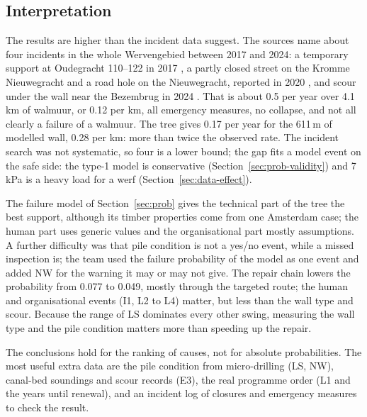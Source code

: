 \subsection{Interpretation}\label{sec:ft-interpretation}

The results are higher than the incident data suggest. The sources
name about four incidents in the whole Wervengebied between 2017 and 2024: a
temporary support at Oudegracht 110--122 in 2017 \parencite{duic2022}, a partly
closed street on the Kromme Nieuwegracht and a road hole on the Nieuwegracht,
reported in 2020 \parencite{duic2020}, and scour under the wall near the
Bezembrug in 2024 \parencite{wijkbericht2024walmuur}. That is about 0.5 per year
over 4.1\,km of walmuur, or 0.12 per km, all emergency measures, no collapse,
and not all clearly a failure of a walmuur. The tree gives 0.17 per year for the
611\,m of modelled wall, 0.28 per km: more than twice the observed rate.
The incident search was not systematic, so four is a lower bound; the gap fits
a model event on the safe side: the type-1 model is
conservative (Section~\ref{sec:prob-validity}) and 7\,kPa is a heavy load for a
werf (Section~\ref{sec:data-effect}).

The failure model of Section~\ref{sec:prob} gives the technical part of the tree the best support, although its timber properties come from one Amsterdam case; the human part uses generic values and the organisational part mostly
assumptions. A further difficulty was that pile condition is not a yes/no event,
while a missed inspection is; the team used the failure probability of the model
as one event and added NW for the warning it may or may not give. The repair
chain lowers the probability from 0.077 to 0.049, mostly through the targeted
route; the human and organisational events (I1, L2 to L4) matter, but less than
the wall type and scour. Because the range of LS dominates every other swing,
measuring the wall type and the pile condition matters more than speeding up
the repair.

The conclusions hold for the ranking of causes, not for absolute
probabilities. The most useful extra data are the
pile condition from micro-drilling (LS, NW), canal-bed soundings and scour records
(E3), the real programme order (L1 and the years until renewal), and an incident
log of closures and emergency measures to check the result.


\providecommand{\euro}{\texteuro}


